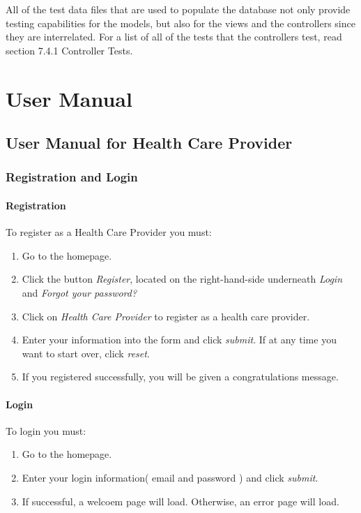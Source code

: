 \documentclass[12pt]{report}
\begin{document}
All of the test data files that are used to populate the database not only provide testing capabilities for the models, but also for the views and the controllers since they are interrelated.  For a list of all of the tests that the controllers test, read section 7.4.1 Controller Tests.


\part{User Manual}

\chapter{User Manual for Health Care Provider}

\section{Registration and Login}
\subsection{Registration}
To register as a Health Care Provider you must:
\begin{enumerate}
\item Go to the homepage.
\item Click the button \textit{Register}, located on the right-hand-side underneath \textit{Login} and \textit{Forgot your password?}
\item Click on \textit{Health Care Provider} to register as a health care provider.
\item Enter your information into the form and click \textit{submit}. If at any time you want to start over, click \textit{reset}.
\item If you registered successfully, you will be given a congratulations message.
\end{enumerate}
\subsection{Login}
To login you must:
\begin{enumerate}
\item Go to the homepage.
\item Enter your login information( email and password ) and click \textit{submit}.
\item If successful, a welcoem page will load. Otherwise, an error page will load. 
\end{enumerate}
\end{document}
